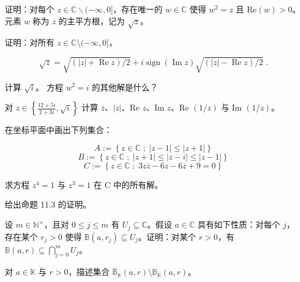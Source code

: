 \begin{exercises}
\item

\begin{items}
\item

证明：对每个 $ z \in \mathbb{C}\backslash(-\infty,0] $，存在唯一的 $ w \in \mathbb{C} $ 使得 $ w^2 = z $ 且 $ \mathrm{Re}(w) > 0 $。元素 $ w $ 称为 $ z $ 的主平方根，记为 $ \sqrt{z} $。

\item

证明：对所有 $ z \in \mathbb{C} \setminus (-\infty, 0] $，

\[
\sqrt{z}=\sqrt{(|z|+\operatorname{Re}z)/2}+i\operatorname{sign}(\operatorname{Im}z)\sqrt{(|z|-\operatorname{Re}z)/2}\;.
\]
\item

计算 $ \sqrt{i} $。
方程 $ w^{2}=i $ 的其他解是什么？

\end{items}

\item

对 $ z \in \left\{\frac{12+5i}{2+3i}, \sqrt{i}\right\} $ 计算 $ \overline{z} $、$ |z| $、Re $ z $、Im $ z $、Re $ (1/z) $ 与 Im $ (1/z) $。

\item

在坐标平面中画出下列集合：

\[
A:=\left\{z\in\mathbb{C}\;;\;|z-1|\leq|z+1|\right\}
\]
\[
B:=\left\{z\in\mathbb{C}\;;\;|z+1|\leq|z-i|\leq|z-1|\right\}
\]
\[
C:=\left\{z\in\mathbb{C}\;;\;3z\overline{z}-6z-6\overline{z}+9=0\right\}
\]
\item

求方程 $ z^{4}=1 $ 与 $ z^{3}=1 $ 在 C 中的所有解。

\item

给出命题 11.3 的证明。

\item

设 $ m \in \mathbb{N}^\times $，且对 $ 0 \leq j \leq m $ 有 $ U_j \subseteq \mathbb{C} $。假设 $ a \in \mathbb{C} $ 具有如下性质：对每个 $ j $，存在某个 $ r_j > 0 $ 使得 $ \mathbb{B}(a, r_j) \subseteq U_j $。证明：对某个 $ r > 0 $，有 $ \mathbb{B}(a, r) \subseteq \bigcap_{j=0}^{m} U_j $。

\item

对 $ a \in \mathbb{K} $ 与 $ r > 0 $，描述集合 $ \bar{\mathbb{B}}_{\mathbb{K}}(a, r) \setminus \mathbb{B}_{\mathbb{K}}(a, r) $。


\end{exercises}
